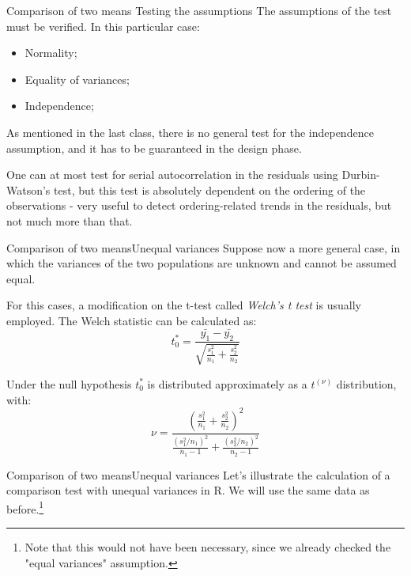 \begin{frame}
{Comparison of two means}
{Testing the assumptions}
The assumptions of the test must be verified. In this particular case:

{\smaller
\begin{itemize}
  \item Normality;
  \item Equality of variances;
  \item \alert{Independence};
\end{itemize}}
\bigskip

As mentioned in the last class, there is no general test for the independence assumption, and it has to be guaranteed in the design phase.
\bigskip

One can at most test for serial autocorrelation in the residuals using Durbin-Watson's test, but this test is absolutely dependent on the ordering of the observations - very useful to detect ordering-related trends in the residuals, but not much more than that.
\end{frame}

\begin{frame}{Comparison of two means}{Unequal variances}
Suppose now a more general case, in which the variances of the two populations are unknown and cannot be assumed equal.
\bigskip

For this cases, a modification on the t-test called \textit{Welch's t test} is usually employed. The Welch statistic can be calculated as:
\begin{equation*}
  t^*_0 = \frac{\bar{y_1} - \bar{y_2}}{\sqrt{\frac{s_1^2}{n_1} + \frac{s_2^2}{n_2}}}
\end{equation*}
\bigskip

Under the null hypothesis $t^*_0$  is distributed approximately as a $t^{(\nu)}$ distribution, with:
\begin{equation*}
\nu = \frac{\left(\frac{s_1^2}{n_1} + \frac{s_2^2}{n_2}\right)^2}{\frac{\left(s_1^2/n_1\right)^2}{n_1-1} + \frac{\left(s_2^2/n_2\right)^2}{n_2-1}}
\end{equation*}
\end{frame}



\begin{frame}[fragile]{Comparison of two means}{Unequal variances}
Let's illustrate the calculation of a comparison test with unequal variances in R. We will use the same data as before.\footnote{Note that this would not have been necessary, since we already checked the "equal variances" assumption.}
\bigskip

{}
\end{frame}

